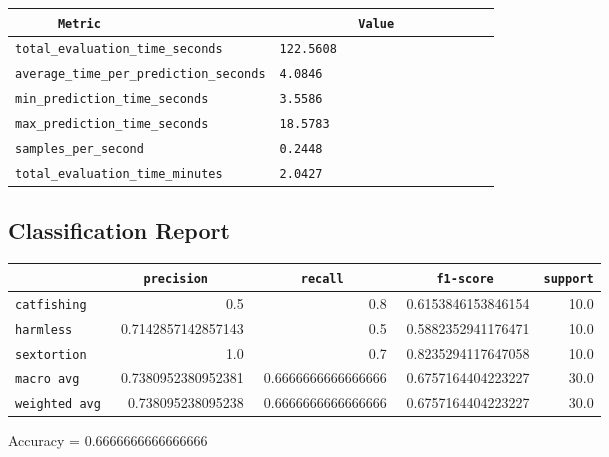 \documentclass{article}
\begin{document}
\begin{center}
\begin{tabular}{l | l} \hline
    \verb|      Metric     | & \verb|           Value           | \\ \hline
    \hline
    \verb|total_evaluation_time_seconds| & \verb|122.5608                     | \\ \hline
    \verb|average_time_per_prediction_seconds| & \verb|4.0846                       | \\ \hline
    \verb|min_prediction_time_seconds| & \verb|3.5586                       | \\ \hline
    \verb|max_prediction_time_seconds| & \verb|18.5783                      | \\ \hline
    \verb|samples_per_second| & \verb|0.2448                       | \\ \hline
    \verb|total_evaluation_time_minutes| & \verb|2.0427                       | \\ \hline
\end{tabular}
\end{center}

\subsection{Classification Report}

\begin{center}
\begin{tabular}{l | r | r | r | r} \hline
    \verb|            | & \verb|    precision     | & \verb|      recall      | & \verb|     f1-score     | & \verb|support| \\ \hline
    \hline
    \verb|catfishing | & 0.5 & 0.8 & 0.6153846153846154 &    10.0 \\ \hline
    \verb|harmless   | & 0.7142857142857143 & 0.5 & 0.5882352941176471 &    10.0 \\ \hline
    \verb|sextortion | & 1.0 & 0.7 & 0.8235294117647058 &    10.0 \\ \hline
    \verb|macro avg  | & 0.7380952380952381 & 0.6666666666666666 & 0.6757164404223227 &    30.0 \\ \hline
    \verb|weighted avg| & 0.738095238095238 & 0.6666666666666666 & 0.6757164404223227 &    30.0 \\ \hline
\end{tabular}
\end{center}

\begin{center}
Accuracy = 0.6666666666666666
\end{center}
\end{document}
